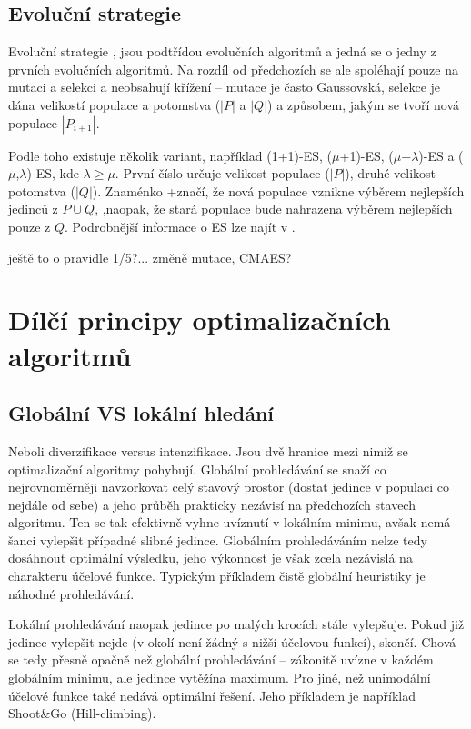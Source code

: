 \subsection{Evoluční strategie}

Evoluční strategie \cite{ES comprehensive},\cite{GO ebook} jsou podtřídou evolučních algoritmů a jedná se o jedny z prvních evolučních algoritmů. Na rozdíl od předchozích se ale spoléhají pouze na mutaci a selekci a neobsahují křížení -- mutace je často Gaussovská, selekce je dána velikostí populace a potomstva ($|P|$ a $|Q|$) a způsobem, jakým se tvoří nová populace $|P_{i+1}|$.

Podle toho existuje několik variant, například (1+1)-ES, ($\mu$+1)-ES, ($\mu$+$\lambda$)-ES a ($\mu$,$\lambda$)-ES, kde $\lambda \geq \mu$. První číslo určuje velikost populace ($|P|$), druhé velikost potomstva ($|Q|$). Znaménko \bq +\eq   značí, že nová populace vznikne výběrem nejlepších jedinců z $P\cup Q$, \bq ,\eq   naopak, že stará populace bude nahrazena výběrem nejlepších pouze z $Q$. Podrobnější informace o ES lze najít v \cite{ES comprehensive}.

ještě to o pravidle 1/5?... změně mutace, CMAES?

\section{Dílčí principy optimalizačních algoritmů}\label{myslenky GO}

\subsection{Globální VS lokální hledání}

Neboli diverzifikace versus intenzifikace. Jsou dvě hranice mezi nimiž se optimalizační algoritmy pohybují. Globální prohledávání se snaží co nejrovnoměrněji navzorkovat celý stavový prostor (dostat jedince v populaci co nejdále od sebe) a jeho průběh prakticky nezávisí na předchozích stavech algoritmu. Ten se tak efektivně vyhne uvíznutí v lokálním minimu, avšak nemá šanci vylepšit případné slibné jedince. Globálním prohledáváním nelze tedy dosáhnout optimální výsledku, jeho výkonnost je však zcela nezávislá na charakteru účelové funkce. Typickým příkladem čistě globální heuristiky je náhodné prohledávání.

Lokální prohledávání naopak jedince po malých krocích stále vylepšuje. Pokud již jedinec vylepšit nejde (v okolí není žádný s nižší účelovou funkcí), skončí. Chová se tedy přesně opačně než globální prohledávání -- zákonitě uvízne v každém globálním minimu, ale jedince \bq vytěží\eq na maximum. Pro jiné, než unimodální účelové funkce také nedává optimální řešení. Jeho příkladem je například Shoot\&Go (Hill-climbing).

